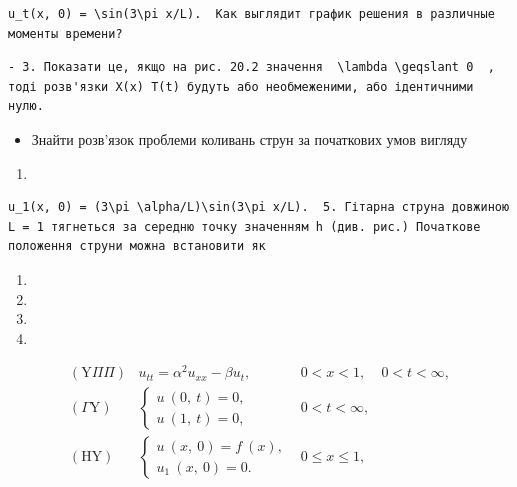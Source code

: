\documentclass[
  ukrainian,
]{article}
\providecommand{\tightlist}{%
  \setlength{\itemsep}{0pt}\setlength{\parskip}{0pt}}
\begin{document}
\begin{verbatim}
u_t(x, 0) = \sin(3\pi x/L).  Как выглядит график решения в различные моменты времени?
\end{verbatim}

\begin{verbatim}
- 3. Показати це, якщо на рис. 20.2 значення  \lambda \geqslant 0  , тоді розв'язки X(x) T(t) будуть або необмеженими, або ідентичними нулю.
\end{verbatim}

\begin{itemize}
\tightlist
\item
  Знайти розв'язок проблеми коливань струн за початкових умов вигляду
\end{itemize}

\begin{enumerate}
\def\labelenumi{\arabic{enumi}.}
\setcounter{enumi}{11}
\tightlist
\item
\end{enumerate}

\begin{verbatim}
u_1(x, 0) = (3\pi \alpha/L)\sin(3\pi x/L).  5. Гітарна струна довжиною L = 1 тягнеться за середню точку значенням h (див. рис.) Початкове положення струни можна встановити як
\end{verbatim}

\begin{enumerate}
\def\labelenumi{\arabic{enumi}.}
\setcounter{enumi}{12}
\tightlist
\item
\item
\item
\item
\end{enumerate}

\[
\begin{array}{lll} (\mathrm{Y} \Pi \Pi) & u_{tt} = \alpha^2 u_{xx} - \beta u_t, & 0 < x < 1, & 0 < t < \infty, \\ (\Gamma \mathrm{Y}) & \begin{cases} u \ (0, \ t) = 0, \\ u \ (1, \ t) = 0, \end{cases} & 0 < t < \infty, \\ (\mathrm{H} \mathrm{Y}) & \begin{cases} u \ (x, \ 0) = f \ (x), \\ u_1 \ (x, \ 0) = 0. \end{cases} & 0 \leqslant x \leqslant 1, \end{array}
\]
\end{document}
